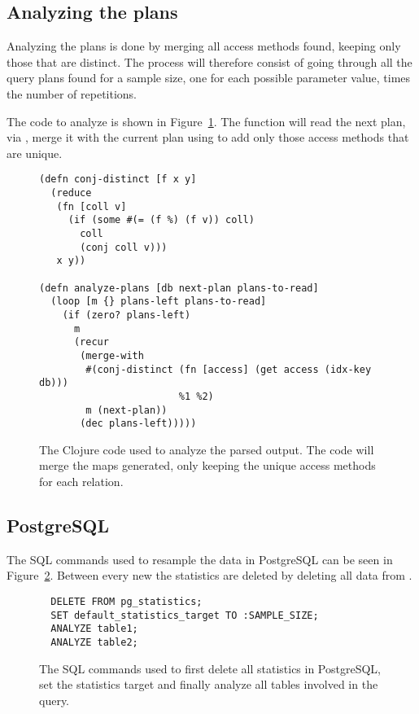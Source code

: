 \subsection{Analyzing the plans}\label{sec:analyzingplans}
Analyzing the plans is done by merging all access methods found, keeping only those
that are distinct. The process will therefore consist of going through all the
query plans found for a sample size, one for each possible parameter value,
times the number of repetitions.

The code to analyze is shown in Figure~\ref{fig:clj:analyzing}. The
 function will read the next plan, via ,
merge it with the current plan using  to add only those
access methods that are unique.

\begin{figure}[ht]
\begin{verbatim}
(defn conj-distinct [f x y]
  (reduce
   (fn [coll v]
     (if (some #(= (f %) (f v)) coll)
       coll
       (conj coll v)))
   x y))

(defn analyze-plans [db next-plan plans-to-read]
  (loop [m {} plans-left plans-to-read]
    (if (zero? plans-left)
      m
      (recur
       (merge-with
        #(conj-distinct (fn [access] (get access (idx-key db)))
                        %1 %2)
        m (next-plan))
       (dec plans-left)))))
   \end{verbatim}
   \caption[The clojure code to analyze a query]{The Clojure code used to
     analyze the parsed output. The code will merge the maps generated, only
     keeping the unique access methods for each relation.}
\label{fig:clj:analyzing}
\end{figure}

\subsection{PostgreSQL}\label{sec:postgresql}
The SQL commands used to resample the data in PostgreSQL can be seen in
Figure~\ref{fig:sql:pganalyze}. Between every new  the statistics
are deleted by deleting all data from .

\begin{figure}[ht]
\begin{verbatim}
  DELETE FROM pg_statistics;
  SET default_statistics_target TO :SAMPLE_SIZE;
  ANALYZE table1;
  ANALYZE table2;
\end{verbatim}
\caption[The SQL commands used to resample inPostgreSQL.]{The SQL commands used
  to first delete all statistics in PostgreSQL, set the statistics target and
  finally analyze all tables involved in the query.}
\label{fig:sql:pganalyze}
\end{figure}

